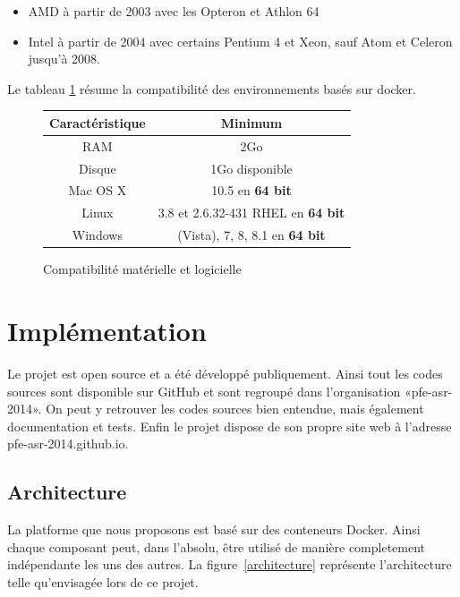 \documentclass[a4paper,11pt]{report}
\begin{document}
\begin{itemize}
  \item AMD à partir de 2003 avec les Opteron et Athlon 64
  \item Intel à partir de 2004 avec certains Pentium 4 et Xeon, sauf Atom et Celeron jusqu'à 2008.
\end{itemize}

Le tableau \ref{compat} résume la compatibilité des environnements basés sur docker.

   \begin{figure}[h!]
\begin{center}
   \begin{tabular}{| c | c |}
     \hline
     Caractéristique & Minimum \\ \hline
     RAM & 2Go \\ \hline
     Disque & 1Go disponible \\ \hline
     Mac OS X & 10.5 en \textbf{64 bit} \\ \hline
     Linux & 3.8 et 2.6.32-431 RHEL en \textbf{64 bit} \\ \hline
     Windows & (Vista), 7, 8, 8.1 en \textbf{64 bit} \\
     \hline
   \end{tabular}
   \end{center}
   \caption{Compatibilité matérielle et logicielle}
   \label{compat}
  
\end{figure}

\chapter{Implémentation}

Le projet est open source et a été développé publiquement. Ainsi tout les codes sources sont disponible sur GitHub et sont regroupé dans l'organisation «pfe-asr-2014». On peut y retrouver les codes sources bien entendue, mais également documentation et tests. Enfin le projet dispose de son propre site web à l'adresse pfe-asr-2014.github.io.

\section{Architecture}

La platforme que nous proposons est basé sur des conteneurs Docker. Ainsi chaque composant peut, dans l'absolu, être utilisé de manière
completement indépendante les uns des autres. La figure~\ref{architecture} représente l'architecture telle qu'envisagée lors de ce projet.
\end{document}
